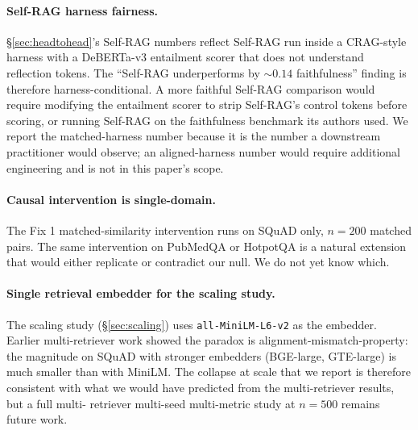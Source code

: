 \paragraph{Self-RAG harness fairness.}
\S\ref{sec:headtohead}'s Self-RAG numbers reflect Self-RAG run inside
a CRAG-style harness with a DeBERTa-v3 entailment scorer that does
not understand reflection tokens. The
``Self-RAG underperforms by $\sim 0.14$ faithfulness'' finding is
therefore harness-conditional. A more faithful Self-RAG comparison
would require modifying the entailment scorer to strip Self-RAG's
control tokens before scoring, or running Self-RAG on the
faithfulness benchmark its authors used. We report the
matched-harness number because it is the number a downstream
practitioner would observe; an aligned-harness number would
require additional engineering and is not in this paper's scope.

\paragraph{Causal intervention is single-domain.}
The Fix 1 matched-similarity intervention runs on SQuAD only,
$n{=}200$ matched pairs. The same intervention on PubMedQA or
HotpotQA is a natural extension that would either replicate or
contradict our null. We do not yet know which.

\paragraph{Single retrieval embedder for the scaling study.}
The scaling study (\S\ref{sec:scaling}) uses
\texttt{all-MiniLM-L6-v2} as the embedder. Earlier multi-retriever
work showed the paradox is alignment-mismatch-property:
the magnitude on SQuAD with stronger embedders (BGE-large,
GTE-large) is much smaller than with MiniLM. The collapse at scale
that we report is therefore consistent with what we would have
predicted from the multi-retriever results, but a full multi-
retriever multi-seed multi-metric study at $n{=}500$ remains future
work.
